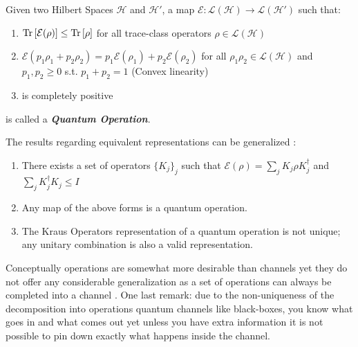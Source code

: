 \begin{definition}
  Given two Hilbert Spaces $\mathcal{H}$ and $\mathcal{H}'$, a map $\mathcal{E}:\mathcal{L}(\mathcal{H})\to\mathcal{L}(\mathcal{H}')$ such that:
  \begin{enumerate}
          \item $\mathrm{Tr}\left[\mathcal{E}(\rho)\right]\leq\mathrm{Tr}\left[\rho\right]$ for all trace-class operators $\rho \in \mathcal{L}(\mathcal{H})$
          \item $\mathcal{E}(p_{1}\rho_{1}+p_{2}\rho_{2}) =p_{1}\mathcal{E}(\rho_{1})+p_{2}\mathcal{E}(\rho_{2}) $ for all $\rho_{1} \rho_{2} \in \mathcal{L}(\mathcal{H})$ and $p_{1}, p_{2} \geq 0$ s.t. $p_{1}+p_{2}=1$ (Convex linearity)
          \item is completely positive
  \end{enumerate}
  is called a \textbf{\textit{Quantum Operation}}.
\end{definition}
The results regarding equivalent representations can be generalized \cite{strasberg2022quantum,wiseman_quantum_2010}:
\begin{enumerate}
  \item There exists a set of operators $\{K_{j} \}_{j}$ such that $\mathcal{E}(\rho) = \sum_{j}K_{j}\rho K_{j}^{\dagger}$ and $\sum_{j}K_{j}^{\dagger}K_{j}\leq I$
  \item Any map of the above forms is a quantum operation.
  \item The Kraus Operators representation of a quantum operation is not unique; any unitary combination is also a valid representation.
\end{enumerate}
Conceptually operations are somewhat more desirable than channels yet they do not offer any considerable generalization as a set of operations
can always be completed into a channel \cite{nielsen_quantum_2010}. One last remark: due to the non-uniqueness of the decomposition into operations quantum channels  like black-boxes,
you know what goes in and what comes out yet unless you have extra information it is not possible to pin down exactly what happens inside the
channel.
